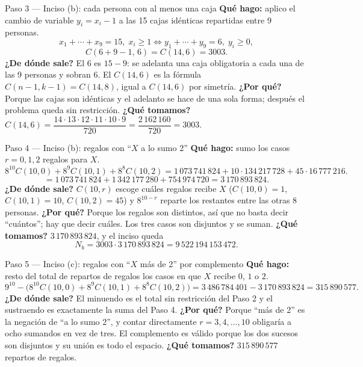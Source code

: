 \documentclass[11pt]{article}
\begin{document}
\begin{paso}{Paso 3 --- Inciso (b): cada persona con al menos una caja}
\textbf{Qué hago:} aplico el cambio de variable $y_i=x_i-1$ a las 15 cajas idénticas repartidas entre 9 personas.
\[
x_1+\cdots+x_9=15,\;x_i\ge1\iff y_1+\cdots+y_9=6,\;y_i\ge0,
\]
\[
C(6+9-1,\,6)=C(14,6)=3003 .
\]
\textbf{¿De dónde sale?} El $6$ es $15-9$: se adelanta una caja obligatoria a cada una de las 9 personas y sobran $6$. El $C(14,6)$ es la fórmula $C(n-1,k-1)=C(14,8)$, igual a $C(14,6)$ por simetría.
\textbf{¿Por qué?} Porque las cajas son idénticas y el adelanto se hace de una sola forma; después el problema queda sin restricción.
\textbf{¿Qué tomamos?} $C(14,6)=\dfrac{14\cdot13\cdot12\cdot11\cdot10\cdot9}{720}=\dfrac{2\,162\,160}{720}=3003$.
\end{paso}

\begin{paso}{Paso 4 --- Inciso (b): regalos con ``$X$ a lo sumo 2''}
\textbf{Qué hago:} sumo los casos $r=0,1,2$ regalos para $X$.
\[
8^{10}C(10,0)+8^{9}C(10,1)+8^{8}C(10,2)
=1\,073\,741\,824+10\cdot134\,217\,728+45\cdot16\,777\,216 .
\]
\[
=1\,073\,741\,824+1\,342\,177\,280+754\,974\,720=3\,170\,893\,824 .
\]
\textbf{¿De dónde sale?} $C(10,r)$ escoge cuáles regalos recibe $X$ ($C(10,0)=1$, $C(10,1)=10$, $C(10,2)=45$) y $8^{10-r}$ reparte los restantes entre las otras $8$ personas.
\textbf{¿Por qué?} Porque los regalos son distintos, así que no basta decir ``cuántos''; hay que decir cuáles. Los tres casos son disjuntos y se suman.
\textbf{¿Qué tomamos?} $3\,170\,893\,824$, y el inciso queda
\[
N_b=3003\cdot 3\,170\,893\,824=9\,522\,194\,153\,472 .
\]
\end{paso}

\begin{paso}{Paso 5 --- Inciso (c): regalos con ``$X$ más de 2'' por complemento}
\textbf{Qué hago:} resto del total de repartos de regalos los casos en que $X$ recibe $0$, $1$ o $2$.
\[
9^{10}-\bigl(8^{10}C(10,0)+8^9C(10,1)+8^8C(10,2)\bigr)=3\,486\,784\,401-3\,170\,893\,824=315\,890\,577 .
\]
\textbf{¿De dónde sale?} El minuendo es el total sin restricción del Paso 2 y el sustraendo es exactamente la suma del Paso 4.
\textbf{¿Por qué?} Porque ``más de 2'' es la negación de ``a lo sumo 2'', y contar directamente $r=3,4,\ldots,10$ obligaría a ocho sumandos en vez de tres. El complemento es válido porque los dos sucesos son disjuntos y su unión es todo el espacio.
\textbf{¿Qué tomamos?} $315\,890\,577$ repartos de regalos.
\end{paso}
\end{document}
